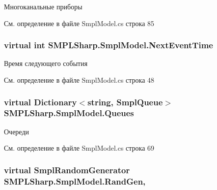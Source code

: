 Многоканальные приборы 



См. определение в файле Smpl\-Model.\-cs строка 85

\hypertarget{class_s_m_p_l_sharp_1_1_smpl_model_a83863cdbfb43901325e891a65fd27d40}{
\subsubsection[{Next\-Event\-Time}]{\setlength{\rightskip}{0pt plus 5cm}virtual int S\-M\-P\-L\-Sharp.\-Smpl\-Model.\-Next\-Event\-Time\hspace{0.3cm}{\ttfamily [get]}}}\label{df/d34/class_s_m_p_l_sharp_1_1_smpl_model_a83863cdbfb43901325e891a65fd27d40}


Время следующего события 



См. определение в файле Smpl\-Model.\-cs строка 48

\hypertarget{class_s_m_p_l_sharp_1_1_smpl_model_a1bbb9a6e7a49ca06902fa90aa611c719}{
\subsubsection[{Queues}]{\setlength{\rightskip}{0pt plus 5cm}virtual Dictionary$<$string, {\bf Smpl\-Queue}$>$ S\-M\-P\-L\-Sharp.\-Smpl\-Model.\-Queues\hspace{0.3cm}{\ttfamily [get]}}}\label{df/d34/class_s_m_p_l_sharp_1_1_smpl_model_a1bbb9a6e7a49ca06902fa90aa611c719}


Очереди 



См. определение в файле Smpl\-Model.\-cs строка 69

\hypertarget{class_s_m_p_l_sharp_1_1_smpl_model_a0f7a947d68471f69ba6afaf03ec15093}{
\subsubsection[{Rand\-Gen}]{\setlength{\rightskip}{0pt plus 5cm}virtual {\bf Smpl\-Random\-Generator} S\-M\-P\-L\-Sharp.\-Smpl\-Model.\-Rand\-Gen\hspace{0.3cm}{\ttfamily [get]}, {\ttfamily [set]}}}\label{df/d34/class_s_m_p_l_sharp_1_1_smpl_model_a0f7a947d68471f69ba6afaf03ec15093}


